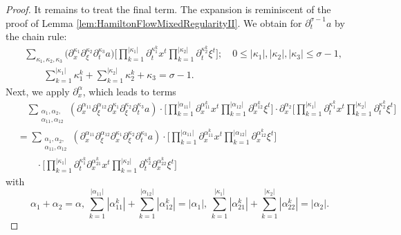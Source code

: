 \documentclass{amsart}
\theoremstyle{definition}
\begin{document}
\begin{proof}
It remains to treat the final term.
The expansion is reminiscent of the proof of Lemma \ref{lem:HamiltonFlowMixedRegularityII}. We obtain for $\partial_t^{\sigma-1} a$ by the chain rule:
\begin{equation*}
\begin{split}
&\sum_{\kappa_1,\kappa_2, \kappa_3} \big( \partial_x^{\kappa_1} \partial_{\xi}^{\kappa_2} \partial_t^{\kappa_3} a \big) \big[ \prod_{k=1}^{|\kappa_1|} \partial_t^{\kappa_1^k} x^t \prod_{k=1}^{|\kappa_2|} \partial_t^{\kappa_2^k} \xi^t \big]; \quad 0 \leq |\kappa_1|, |\kappa_2|,|\kappa_3| \leq \sigma-1, \\ 
&\quad \quad  \sum_{k=1}^{|\kappa_1|} \kappa_1^k + \sum_{k=1}^{|\kappa_2|} \kappa_2^k + \kappa_3  = \sigma-1.
\end{split}
\end{equation*}
Next, we apply $\partial_x^{\alpha}$, which leads to terms
\begin{equation*}
\begin{split}
&\quad \sum_{\substack{\alpha_1,\alpha_2, \\ \alpha_{11}, \alpha_{12}}} (\partial_x^{\alpha_{11}} \partial_{\xi}^{\alpha_{12}} \partial_x^{\kappa_1} \partial_{\xi}^{\kappa_2} \partial_t^{\kappa_3} a) \cdot \big[ \prod_{k=1}^{|\alpha_{11}|} \partial_x^{\alpha_{11}^k} x^t \prod_{k=1}^{|\alpha_{12}|} \partial_x^{\alpha_{12}^k} \xi^t  \big] \cdot \partial_x^{\alpha_{2}} \big[ \prod_{k=1}^{|\kappa_1|} \partial_t^{\kappa_1^k} x^t \prod_{k=1}^{|\kappa_2|} \partial_t^{\kappa_2^k} \xi^t \big] \\
&= \sum_{\substack{\alpha_1,\alpha_2, \\ \alpha_{11}, \alpha_{12}}} (\partial_x^{\alpha_{11}} \partial_{\xi}^{\alpha_{12}} \partial_x^{\kappa_1} \partial_{\xi}^{\kappa_2} \partial_t^{\kappa_3} a) \cdot \big[ \prod_{k=1}^{|\alpha_{11}|} \partial_x^{\alpha_{11}^k} x^t \prod_{k=1}^{|\alpha_{12}|} \partial_x^{\alpha_{12}^k} \xi^t \big] \\
&\quad \quad \cdot \big[ \prod_{k=1}^{|\kappa_1|} \partial_t^{\kappa_1^k} \partial_x^{\alpha_{21}^k} x^t \prod_{k=1}^{|\kappa_2|} \partial_t^{\kappa_2^k} \partial_x^{\alpha_{22}^k} \xi^t \big]
\end{split}
\end{equation*}
with
\begin{equation*}
    \alpha_1 + \alpha_2 = \alpha, \, \sum_{k=1}^{|\alpha_{11}|} |\alpha_{11}^k| + \sum_{k=1}^{|\alpha_{12}|} |\alpha_{12}^k| = |\alpha_{1}|, \, \sum_{k=1}^{|\kappa_1|} |\alpha_{21}^k | + \sum_{k=1}^{|\kappa_2|} |\alpha_{22}^k| = |\alpha_2|.
\end{equation*}


\end{proof}
\end{document}
